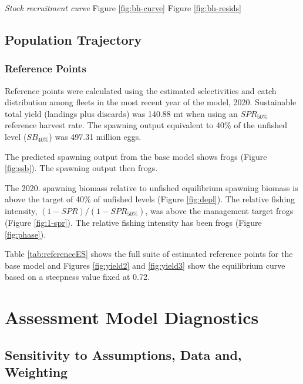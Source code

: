 \documentclass[
  english,
  a4paper,
]{article}
\begin{document}
\emph{Stock recruitment curve}
Figure \ref{fig:bh-curve}
Figure \ref{fig:bh-resids}

\hypertarget{population-trajectory}{%
\subsection{Population Trajectory}\label{population-trajectory}}

\hypertarget{reference-points-1}{%
\subsubsection{Reference Points}\label{reference-points-1}}

Reference points were calculated using the estimated selectivities and catch distribution among fleets in the most recent year of the model, 2020.
Sustainable total yield (landings plus discards) was
140.88 mt when using an \(SPR_{50\%}\)
reference harvest rate. The spawning output equivalent to 40\% of the unfished level (\(SB_{40\%}\)) was 497.31
million eggs.

The predicted spawning output from the base model shows frogs (Figure \ref{fig:ssb}). The spawning output then frogs.

The 2020. spawning biomass relative to unfished equilibrium spawning biomass is above the target of 40\% of unfished levels (Figure \ref{fig:depl}).
The relative fishing intensity, \((1-SPR)/(1-SPR_{50\%})\), was above the management target frogs (Figure \ref{fig:1-spr}). The relative fishing intensity has been frogs (Figure \ref{fig:phase}).

Table \ref{tab:referenceES} shows the full suite of estimated reference points for the base model and Figures \ref{fig:yield2} and \ref{fig:yield3} show the equilibrium curve based on a steepness value fixed at 0.72.

\hypertarget{assessment-model-diagnostics}{%
\section{Assessment Model Diagnostics}\label{assessment-model-diagnostics}}

\hypertarget{sensitivity-to-assumptions-data-and-weighting}{%
\subsection{Sensitivity to Assumptions, Data and, Weighting}\label{sensitivity-to-assumptions-data-and-weighting}}
\end{document}
